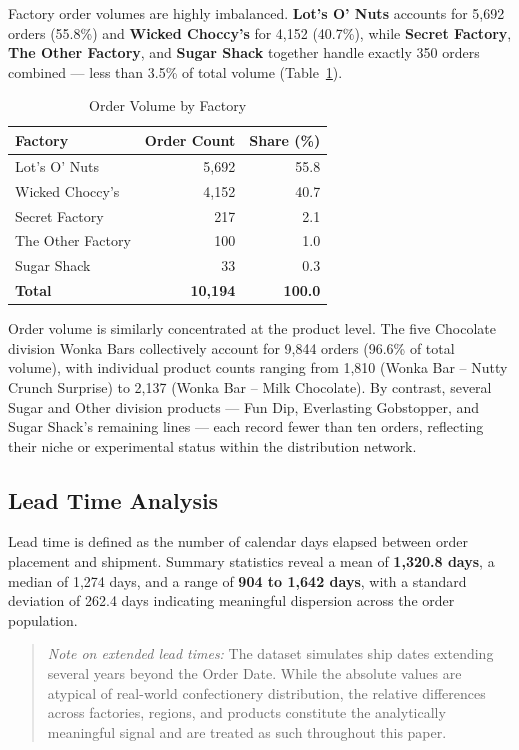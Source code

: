 \documentclass[12pt, a4paper]{article}
\newcommand{\fact}[1]{\textbf{#1}}
\begin{document}
Factory order volumes are highly imbalanced.
\fact{Lot's O' Nuts} accounts for 5,692 orders (55.8\%) and
\fact{Wicked Choccy's} for 4,152 (40.7\%), while
\fact{Secret Factory}, \fact{The Other Factory}, and \fact{Sugar Shack}
together handle exactly 350 orders combined --- less than 3.5\% of total
volume (Table~\ref{tab:factory_counts}).

\begin{table}[H]
\centering
\caption{Order Volume by Factory}
\label{tab:factory_counts}
\renewcommand{\arraystretch}{1.12}
\begin{tabular}{lrr}
\toprule
\textbf{Factory} & \textbf{Order Count} & \textbf{Share (\%)} \\
\midrule
Lot's O' Nuts     & 5,692 & 55.8 \\
Wicked Choccy's   & 4,152 & 40.7 \\
Secret Factory    &   217 &  2.1 \\
The Other Factory &   100 &  1.0 \\
Sugar Shack       &    33 &  0.3 \\
\midrule
\textbf{Total}    & \textbf{10,194} & \textbf{100.0} \\
\bottomrule
\end{tabular}
\end{table}

Order volume is similarly concentrated at the product level.
The five Chocolate division Wonka Bars collectively account for
9,844 orders (96.6\% of total volume), with individual product
counts ranging from 1,810 (Wonka Bar -- Nutty Crunch Surprise)
to 2,137 (Wonka Bar -- Milk Chocolate).
By contrast, several Sugar and Other division products ---
Fun Dip, Everlasting Gobstopper, and Sugar Shack's remaining
lines --- each record fewer than ten orders, reflecting their
niche or experimental status within the distribution network.

\subsection{Lead Time Analysis}

Lead time is defined as the number of calendar days elapsed between
order placement and shipment.
Summary statistics reveal a mean of \fact{1,320.8 days}, a median
of 1,274 days, and a range of \fact{904 to 1,642 days}, with a
standard deviation of 262.4 days indicating meaningful dispersion
across the order population.

\begin{quote}
\textit{Note on extended lead times:} The dataset simulates ship
dates extending several years beyond the Order Date. While the
absolute values are atypical of real-world confectionery distribution,
the relative differences across factories, regions, and products
constitute the analytically meaningful signal and are treated as
such throughout this paper.
\end{quote}
\end{document}
